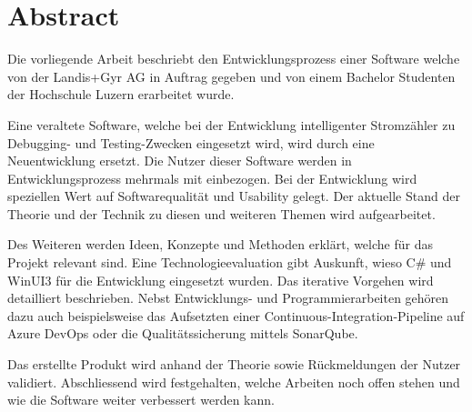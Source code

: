 \begingroup
\let\clearpage\relax
\let\cleardoublepage\relax
\let\cleardoublepage\relax

\cleardoublepage


\chapter*{Abstract}
Die vorliegende Arbeit beschriebt den Entwicklungsprozess einer Software welche von der Landis+Gyr AG in Auftrag gegeben und von einem Bachelor Studenten der Hochschule Luzern erarbeitet wurde.

Eine veraltete Software, welche bei der Entwicklung intelligenter Stromzähler zu Debugging- und Testing-Zwecken eingesetzt wird, wird durch eine Neuentwicklung ersetzt.
Die Nutzer dieser Software werden in Entwicklungsprozess mehrmals mit einbezogen.
Bei der Entwicklung wird speziellen Wert auf Softwarequalität und Usability gelegt.
Der aktuelle Stand der Theorie und der Technik zu diesen und weiteren Themen wird aufgearbeitet.

Des Weiteren werden Ideen, Konzepte und Methoden erklärt, welche für das Projekt relevant sind.
Eine Technologieevaluation gibt Auskunft, wieso C\# und WinUI3 für die Entwicklung eingesetzt wurden.
Das iterative Vorgehen wird detailliert beschrieben.
Nebst Entwicklungs- und Programmierarbeiten gehören dazu auch beispielsweise das Aufsetzten einer Continuous-Integration-Pipeline auf Azure DevOps oder die Qualitätssicherung mittels SonarQube.

Das erstellte Produkt wird anhand der Theorie sowie Rückmeldungen der Nutzer validiert.
Abschliessend wird festgehalten, welche Arbeiten noch offen stehen und wie die Software weiter verbessert werden kann.



